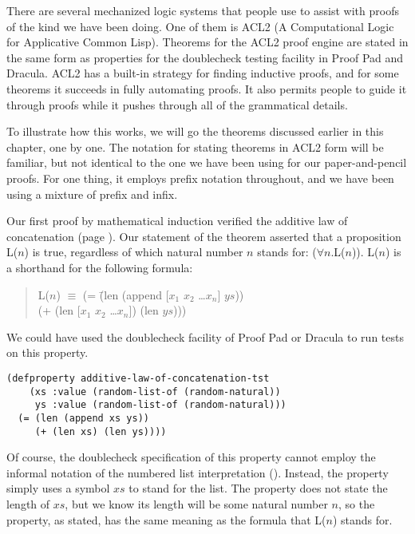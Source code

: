 There are several mechanized logic systems that people use
to assist with proofs of the kind we have been doing.
One of them is ACL2 (A Computational Logic for Applicative Common Lisp).
Theorems for the ACL2 proof engine are stated in the same form
as properties for the doublecheck testing facility in Proof Pad and Dracula.
ACL2 has a built-in strategy for finding inductive proofs,
and for some theorems it succeeds in fully automating proofs.
It also permits people to guide it through proofs while it pushes through all of the grammatical details.

To illustrate how this works, we will go the theorems
discussed earlier in this chapter, one by one.
The notation for stating theorems in ACL2 form will be familiar,
but not identical to the one we have been using
for our paper-and-pencil proofs.
For one thing, it employs prefix notation throughout,
and we have been using a mixture of prefix and infix.

Our first proof by mathematical induction verified
the additive law of concatenation (page \pageref{additive-law-concatenation}).
Our statement of the theorem asserted that a proposition L($n$) is true,
regardless of which natural number $n$ stands for: ($\forall$$n$.L($n$)).
 L($n$) is a shorthand for the following formula:
\begin{quote}
\begin{tabbing}
L($n$) $\equiv$ (= \=(len (append [$x_1$ $x_2$ \dots $x_n$] $ys$))  \\
                   \>(+ (len [$x_1$ $x_2$ \dots $x_n$]) (len $ys$)))
\end{tabbing}
\end{quote}

We could have used the doublecheck facility of Proof Pad or Dracula to run tests on this property.

\begin{Verbatim}
(defproperty additive-law-of-concatenation-tst
    (xs :value (random-list-of (random-natural))
     ys :value (random-list-of (random-natural)))
  (= (len (append xs ys))
     (+ (len xs) (len ys))))
\end{Verbatim}

Of course, the doublecheck specification of this property
cannot employ the informal notation of the numbered list interpretation
(\pageref{numbered-list-interpretation}).
Instead, the property simply uses a symbol $xs$ to stand for the list.
The property does not state the length of $xs$, but we know
its length will be some natural number $n$, so the property, as stated,
has the same meaning as the formula that L($n$) stands for.

